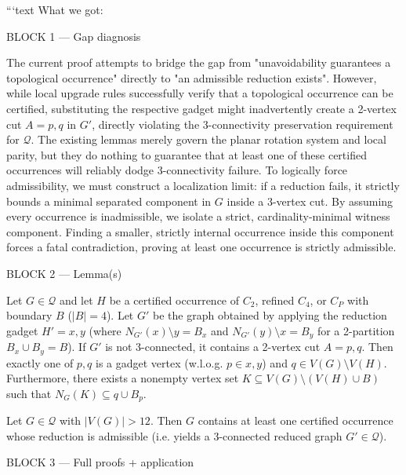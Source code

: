 ```text
What we got:

BLOCK 1 — Gap diagnosis

The current proof attempts to bridge the gap from "unavoidability guarantees a topological occurrence" directly to "an admissible reduction exists". However, while local upgrade rules successfully verify that a topological occurrence can be certified, substituting the respective gadget might inadvertently create a 2-vertex cut $A={p,q}$ in $G'$, directly violating the 3-connectivity preservation requirement for $\mathcal{Q}$. The existing lemmas merely govern the planar rotation system and local parity, but they do nothing to guarantee that at least one of these certified occurrences will reliably dodge 3-connectivity failure. To logically force admissibility, we must construct a localization limit: if a reduction fails, it strictly bounds a minimal separated component in $G$ inside a 3-vertex cut. By assuming every occurrence is inadmissible, we isolate a strict, cardinality-minimal witness component. Finding a smaller, strictly internal occurrence inside this component forces a fatal contradiction, proving at least one occurrence is strictly admissible.

BLOCK 2 — Lemma(s)

\begin{lemma} \label{lem:pullback_inadmissible} Let $G \in \mathcal{Q}$ and let $H$ be a certified occurrence of $C_2$, refined $C_4$, or $C_P$ with boundary $B$ ($|B|=4$). Let $G'$ be the graph obtained by applying the reduction gadget $H'={x,y}$ (where $N_{G'}(x) \setminus {y} = B_x$ and $N_{G'}(y) \setminus {x} = B_y$ for a 2-partition $B_x \cup B_y = B$). If $G'$ is not 3-connected, it contains a 2-vertex cut $A={p,q}$. Then exactly one of ${p,q}$ is a gadget vertex (w.l.o.g. $p \in {x,y}$) and $q \in V(G) \setminus V(H)$. Furthermore, there exists a nonempty vertex set $K \subseteq V(G) \setminus (V(H) \cup B)$ such that $N_G(K) \subseteq {q} \cup B_p$. \end{lemma}

\begin{lemma} \label{lem:admissible_bridge} Let $G \in \mathcal{Q}$ with $|V(G)| > 12$. Then $G$ contains at least one certified occurrence whose reduction is admissible (i.e. yields a 3-connected reduced graph $G' \in \mathcal{Q}$). \end{lemma}

BLOCK 3 — Full proofs + application

